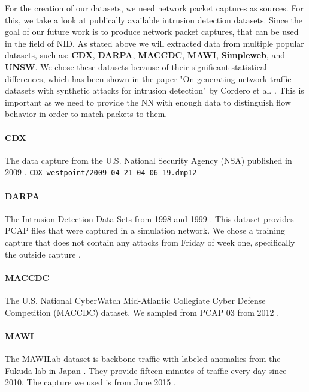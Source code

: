 \documentclass[
	ngerman,
	ruledheaders=section,%
	class=report,%
	thesis={type=bachelor},%
	accentcolor=9c,%
	custommargins=true,%
	marginpar=false,%
	parskip=half-,%
	fontsize=11pt,%
	twoside
]{tudapub}
\let\code\texttt
\begin{document}
For the creation of our datasets, we need network packet captures as sources.
For this, we take a look at publically available intrusion detection datasets.
Since the goal of our future work is to produce network packet captures, that can be used in the field of NID.
As stated above we will extracted data from multiple popular datasets, such as: \textbf{CDX}, \textbf{DARPA}, \textbf{MACCDC}, \textbf{MAWI}, \textbf{Simpleweb}, and \textbf{UNSW}.
We chose these datasets because of their significant statistical differences, which has been shown in the paper "On generating network traffic datasets with synthetic attacks for intrusion detection" by Cordero et al. \cite{corderoGeneratingNetworkTraffic2019}.
This is important as we need to provide the NN with enough data to distinguish flow behavior in order to match packets to them.

\paragraph{CDX} The data capture from the U.S. National Security Agency (NSA) published in 2009 \cite{CyberResearchCenter}.
\code{CDX westpoint/2009-04-21-04-06-19.dmp12}

\paragraph{DARPA} The Intrusion Detection Data Sets from 1998 and 1999 \cite{1999DARPAIntrusion}.
This dataset provides PCAP files that were captured in a simulation network.
We chose a training capture that does not contain any attacks from Friday of week one, specifically the outside capture \cite{MITLincolnLaboratory}.

\paragraph{MACCDC} The U.S. National CyberWatch Mid-Atlantic Collegiate Cyber Defense Competition (MACCDC) dataset.
We sampled from PCAP 03 from 2012 \cite{PCAPFilesUS}.

\paragraph{MAWI} The MAWILab dataset is backbone traffic with labeled anomalies from the Fukuda lab in Japan \cite{MAWILabHome}.
They provide fifteen minutes of traffic every day since 2010. The capture we used is from June 2015 \cite{MAWILabDataSeta}.
\end{document}
